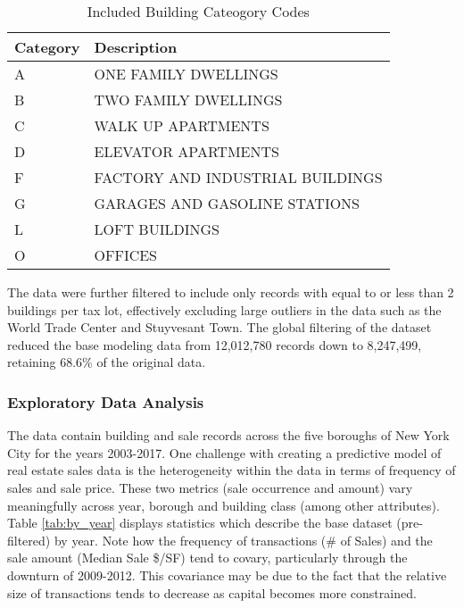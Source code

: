 \documentclass[12pt,]{article}
\begin{document}
\begin{table}

\caption{\label{tab:unnamed-chunk-6}\label{tab:categoryTable} Included Building Cateogory Codes}
\centering
\begin{tabular}[t]{ll}
\toprule
Category & Description\\
\midrule
A & ONE FAMILY DWELLINGS\\
B & TWO FAMILY DWELLINGS\\
C & WALK UP APARTMENTS\\
D & ELEVATOR APARTMENTS\\
F & FACTORY AND INDUSTRIAL BUILDINGS\\
\addlinespace
G & GARAGES AND GASOLINE STATIONS\\
L & LOFT BUILDINGS\\
O & OFFICES\\
\bottomrule
\end{tabular}
\end{table}

The data were further filtered to include only records with equal to or
less than 2 buildings per tax lot, effectively excluding large outliers
in the data such as the World Trade Center and Stuyvesant Town. The
global filtering of the dataset reduced the base modeling data from
12,012,780 records down to 8,247,499, retaining 68.6\% of the original
data.

\hypertarget{exploratory-data-analysis}{%
\subsubsection{Exploratory Data
Analysis}\label{exploratory-data-analysis}}

The data contain building and sale records across the five boroughs of
New York City for the years 2003-2017. One challenge with creating a
predictive model of real estate sales data is the heterogeneity within
the data in terms of frequency of sales and sale price. These two
metrics (sale occurrence and amount) vary meaningfully across year,
borough and building class (among other attributes). Table
\ref{tab:by_year} displays statistics which describe the base dataset
(pre-filtered) by year. Note how the frequency of transactions (\# of
Sales) and the sale amount (Median Sale \$/SF) tend to covary,
particularly through the downturn of 2009-2012. This covariance may be
due to the fact that the relative size of transactions tends to decrease
as capital becomes more constrained.
\end{document}
